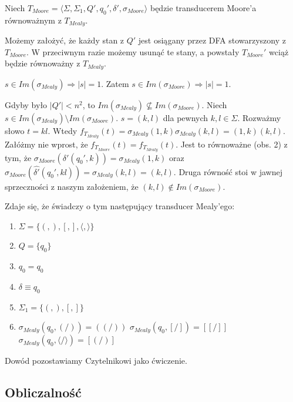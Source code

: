 \documentclass[a4paper,11pt]{article}
\newenvironment{zadanie}[1]
  {\renewcommand\theinnercustomthm{#1}\innercustomthm}
  {\endinnercustomthm}
\newenvironment{obserwacja}[1]
  {\renewcommand\theinnercustomobs{#1}\innercustomobs}
  {\endinnercustomobs}
\begin{document}
Niech $T_{Moore} = \langle \Sigma, \Sigma_1, Q', q_0', \delta', \sigma_{Moore} \rangle$ będzie transducerem Moore'a 
równoważnym z $T_{Mealy}$.

\begin{obserwacja}{1}
 Możemy założyć, że każdy stan z $Q'$ jest osiągany przez DFA stowarzyszony z $T_{Moore}$. W przeciwnym razie możemy usunąć te 
 stany, a powstały $T_{Moore}'$ wciąż będzie równoważny z $T_{Mealy}$.
\end{obserwacja}

\begin{obserwacja}{2}
 $s \in Im(\sigma_{Mealy}) \Rightarrow |s| = 1$. Zatem $s \in Im(\sigma_{Moore}) \Rightarrow |s| = 1$.
\end{obserwacja}

Gdyby było $|Q'| < n^2$, to $Im(\sigma_{Mealy}) \nsubseteq Im(\sigma_{Moore})$. Niech 
$s \in Im(\sigma_{Mealy}) \setminus Im(\sigma_{Moore})$. $s = (k,l)$ dla pewnych $k,l \in \Sigma$. Rozważmy słowo
$t = kl$. Wtedy $f_{T_{Mealy}}(t) = \sigma_{Mealy}(1,k) \sigma_{Mealy}(k,l) = (1,k)(k,l)$. \\
Załóżmy nie wprost, że $f_{T_{Moore}}(t) = f_{T_{Mealy}}(t)$. Jest to równoważne (obs. 2) z tym, że 
$\sigma_{Moore}(\delta'(q_0',k)) = \sigma_{Mealy}(1,k)$ oraz 
$\sigma_{Moore}(\widehat{\delta'}(q_0',kl)) = \sigma_{Mealy}(k,l) = (k,l)$. 
Druga równość stoi w jawnej sprzeczności z naszym założeniem, że $(k,l) \notin Im(\sigma_{Moore})$.

\begin{zadanie}{80}
\end{zadanie}
Zdaje się, że świadczy o tym następujący transducer Mealy'ego:
\begin{enumerate}
 \item $\Sigma = \{(,),[,],\langle,\rangle \}$
 \item $Q = \{q_0\}$
 \item $q_0 = q_0$
 \item $\delta \equiv q_0$
 \item $\Sigma_1 = \{(,),[,] \}$
 \item
 \subitem $\sigma_{Mealy}( q_0, (/) ) = ((/)) $
 \subitem $\sigma_{Mealy}( q_0, [/] ) = [[/]] $
 \subitem $\sigma_{Mealy}( q_0, \langle / \rangle ) = [(/)] $
\end{enumerate}
Dowód pozostawiamy Czytelnikowi jako ćwiczenie. 

\subsection{Obliczalność}
\end{document}
